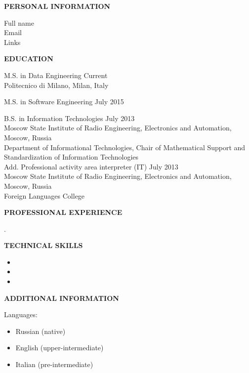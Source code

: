\documentclass[a4paper,12pt,fullpage]{article}
\begin{document}
\begin{center}
	\textbf{PERSONAL INFORMATION\\}
\end{center}
Full name\\
Email\\
Links\\

\begin{center}
	\textbf{EDUCATION}
\end{center}	

M.S. in Data Engineering \hfill Current\\
Politecnico di Milano, Milan, Italy

M.S. in Software Engineering \hfill July 2015

B.S. in Information Technologies \hfill July 2013\\
Moscow State Institute of Radio Engineering, Electronics and Automation, Moscow, Russia\\
Department of Informational Technologies, Chair of Mathematical Support and Standardization of Information Technologies\\

Add. Professional activity area interpreter (IT) \hfill July 2013\\
Moscow State Institute of Radio Engineering, Electronics and Automation, Moscow, Russia\\
Foreign Languages College\\

\begin{center}
	\textbf{PROFESSIONAL EXPERIENCE}
\end{center}	
.\\

\begin{center}
	\textbf{TECHNICAL SKILLS}
\end{center}
\begin{itemize}
	\item 
	\item 
	\item 
\end{itemize}

\begin{center}
	\textbf{ADDITIONAL INFORMATION}
\end{center}
Languages: 
\begin{itemize}
	\item Russian (native)
	\item English (upper-intermediate)
	\item Italian (pre-intermediate)
\end{itemize}
\end{document}
